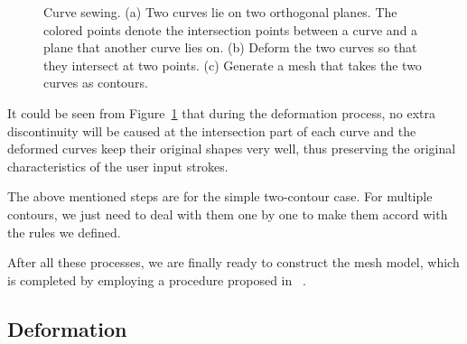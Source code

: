 \begin{figure} [htbp]
{\begin{minipage}[b]{0.25\textwidth}
    \end{minipage}}
  \caption{Curve sewing. (a) Two curves lie on two orthogonal planes. The colored points denote the intersection points between a curve and a plane that another curve lies on. (b) Deform the two curves so that they intersect at two points. (c) Generate a mesh that takes the two curves as contours.}
  \label{fig:curvemerge} %
\end{figure}

It could be seen from Figure~\ref{fig:curvemerge} that during the deformation process, no extra discontinuity will be caused at the intersection part of each curve and the deformed curves keep their original shapes very well, thus preserving the original characteristics of the user input strokes.

The above mentioned steps are for the simple two-contour case. For multiple contours, we just need to deal with them one by one to make them accord with the rules we defined.

After all these processes, we are finally ready to construct the mesh model, which is completed by employing a procedure proposed in ~\cite{LBDLJ08}.

\subsection{Deformation}\label{ch3:sec:alg:deformation}


